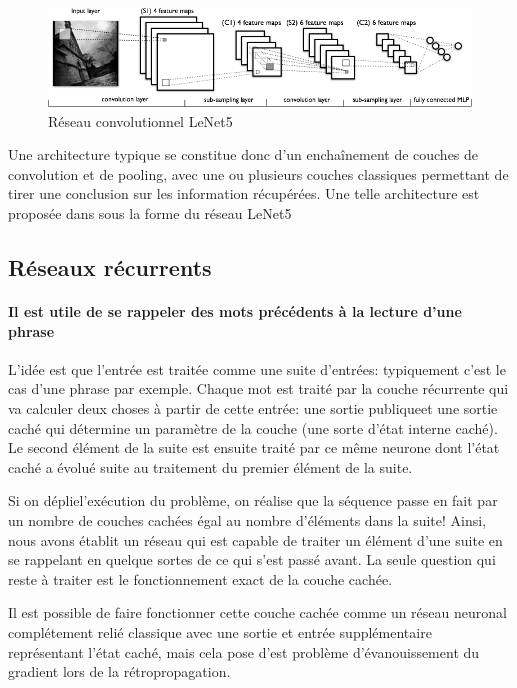 \documentclass[a4paper, journal, 11pt, onecolumn]{IEEEtran}
\begin{document}
\begin{figure}
  \centering
  \includegraphics[scale=0.8]{mylenet}
  \caption{Réseau convolutionnel LeNet5}
\end{figure}

Une architecture typique se constitue donc d'un enchaînement de couches de
convolution et de pooling, avec une ou plusieurs couches \og classiques\fg
permettant de tirer une conclusion sur les information récupérées. Une telle
architecture est proposée dans \cite{lecun1998gradient} sous la forme du réseau LeNet5

\subsection{Réseaux récurrents}

\paragraph{Il est utile de se rappeler des mots précédents à la lecture d'une phrase}

L'idée est que l'entrée est traitée comme une suite d'entrées:
typiquement c'est le cas d'une phrase par exemple. Chaque mot est traité par la
couche récurrente qui va calculer deux choses à partir de cette entrée: une
sortie \og publique\fg et une sortie caché qui détermine un paramètre de la
couche (une sorte d'état interne caché). Le second élément de la suite est
ensuite traité par ce même neurone dont l'état caché a évolué suite au
traitement du premier élément de la suite.

Si on \og déplie\fg l'exécution du problème, on réalise que la séquence passe en
fait par un nombre de couches cachées égal au nombre d'éléments dans la suite!
Ainsi, nous avons établit un réseau qui est capable de traiter un élément d'une
suite en se rappelant en quelque sortes de ce qui s'est passé avant. La seule
question qui reste à traiter est le fonctionnement exact de la couche cachée.

Il est possible de faire fonctionner cette couche cachée comme un réseau neuronal
complétement relié classique avec une sortie et entrée supplémentaire
représentant l'état caché, mais cela pose d'est problème d'évanouissement du
gradient lors de la rétropropagation.
\end{document}
